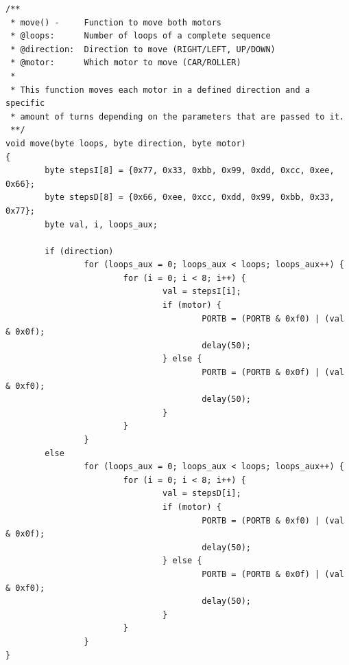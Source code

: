 \clearpage
\begin{lstlisting}
/**
 * move() -     Function to move both motors
 * @loops:      Number of loops of a complete sequence
 * @direction:  Direction to move (RIGHT/LEFT, UP/DOWN)
 * @motor:      Which motor to move (CAR/ROLLER) 
 *
 * This function moves each motor in a defined direction and a specific
 * amount of turns depending on the parameters that are passed to it.
 **/
void move(byte loops, byte direction, byte motor) 
{
        byte stepsI[8] = {0x77, 0x33, 0xbb, 0x99, 0xdd, 0xcc, 0xee, 0x66};
        byte stepsD[8] = {0x66, 0xee, 0xcc, 0xdd, 0x99, 0xbb, 0x33, 0x77}; 
        byte val, i, loops_aux;

        if (direction)
                for (loops_aux = 0; loops_aux < loops; loops_aux++) {
                        for (i = 0; i < 8; i++) {		
                                val = stepsI[i];
                                if (motor) {
                                        PORTB = (PORTB & 0xf0) | (val & 0x0f);
                                        delay(50);
                                } else {
                                        PORTB = (PORTB & 0x0f) | (val & 0xf0);
                                        delay(50);
                                }
                        }
                }
        else
                for (loops_aux = 0; loops_aux < loops; loops_aux++) {
                        for (i = 0; i < 8; i++) {		
                                val = stepsD[i];
                                if (motor) {
                                        PORTB = (PORTB & 0xf0) | (val & 0x0f);
                                        delay(50);
                                } else {
                                        PORTB = (PORTB & 0x0f) | (val & 0xf0);
                                        delay(50);
                                }
                        }
                }
}
\end{lstlisting}
